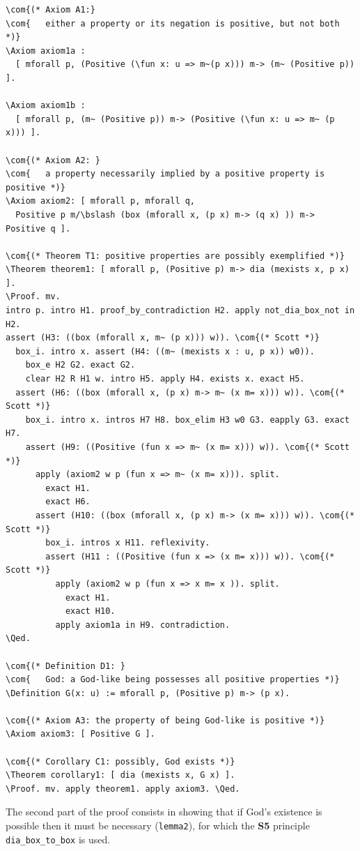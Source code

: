 \documentclass{llncs}
\newcommand{\red}[1]{\textcolor[rgb]{1,0,0}{#1}}
\newcommand{\blue}[1]{\textcolor[rgb]{0,0,1}{#1}}
\newcommand{\brown}[1]{\textcolor[rgb]{0.8,0.6,0.4}{#1}}
\newcommand{\Axiom}{\red{Axiom}}
\newcommand{\Theorem}{\red{Theorem}}
\newcommand{\Definition}{\red{Definition}}
\newcommand{\fun}{\blue{fun}}
\newcommand{\Proof}{\blue{Proof}}
\newcommand{\Qed}{\blue{Qed}}
\newcommand{\com}[1]{\brown{#1}}
\newcommand{\bslash}{\symbol{92}}
\begin{document}
\begin{Verbatim}[commandchars=\\\{\},fontsize=\verbsize]
\com{(* Axiom A1:} 
\com{   either a property or its negation is positive, but not both *)}
\Axiom axiom1a : 
  [ mforall p, (Positive (\fun x: u => m~(p x))) m-> (m~ (Positive p)) ].

\Axiom axiom1b : 
  [ mforall p, (m~ (Positive p)) m-> (Positive (\fun x: u => m~ (p x))) ].

\com{(* Axiom A2: }
\com{   a property necessarily implied by a positive property is positive *)}
\Axiom axiom2: [ mforall p, mforall q, 
  Positive p m/\bslash (box (mforall x, (p x) m-> (q x) )) m-> Positive q ].

\com{(* Theorem T1: positive properties are possibly exemplified *)}
\Theorem theorem1: [ mforall p, (Positive p) m-> dia (mexists x, p x) ].
\Proof. mv.
intro p. intro H1. proof_by_contradiction H2. apply not_dia_box_not in H2.
assert (H3: ((box (mforall x, m~ (p x))) w)). \com{(* Scott *)}
  box_i. intro x. assert (H4: ((m~ (mexists x : u, p x)) w0)).
    box_e H2 G2. exact G2.
    clear H2 R H1 w. intro H5. apply H4. exists x. exact H5.
  assert (H6: ((box (mforall x, (p x) m-> m~ (x m= x))) w)). \com{(* Scott *)}   
    box_i. intro x. intros H7 H8. box_elim H3 w0 G3. eapply G3. exact H7.
    assert (H9: ((Positive (fun x => m~ (x m= x))) w)). \com{(* Scott *)}
      apply (axiom2 w p (fun x => m~ (x m= x))). split.
        exact H1.
        exact H6.
      assert (H10: ((box (mforall x, (p x) m-> (x m= x))) w)). \com{(* Scott *)}
        box_i. intros x H11. reflexivity.
        assert (H11 : ((Positive (fun x => (x m= x))) w)). \com{(* Scott *)}
          apply (axiom2 w p (fun x => x m= x )). split.
            exact H1.
            exact H10.
          apply axiom1a in H9. contradiction.
\Qed.

\com{(* Definition D1: }
\com{   God: a God-like being possesses all positive properties *)}
\Definition G(x: u) := mforall p, (Positive p) m-> (p x).

\com{(* Axiom A3: the property of being God-like is positive *)}
\Axiom axiom3: [ Positive G ].

\com{(* Corollary C1: possibly, God exists *)}
\Theorem corollary1: [ dia (mexists x, G x) ]. 
\Proof. mv. apply theorem1. apply axiom3. \Qed.
\end{Verbatim}

\noindent 
The second part of the proof consists in showing that if
God's existence is possible then it must be necessary
(\texttt{lemma2}), for which the \textbf{S5} principle
\texttt{dia\_box\_to\_box} is used.
\end{document}
